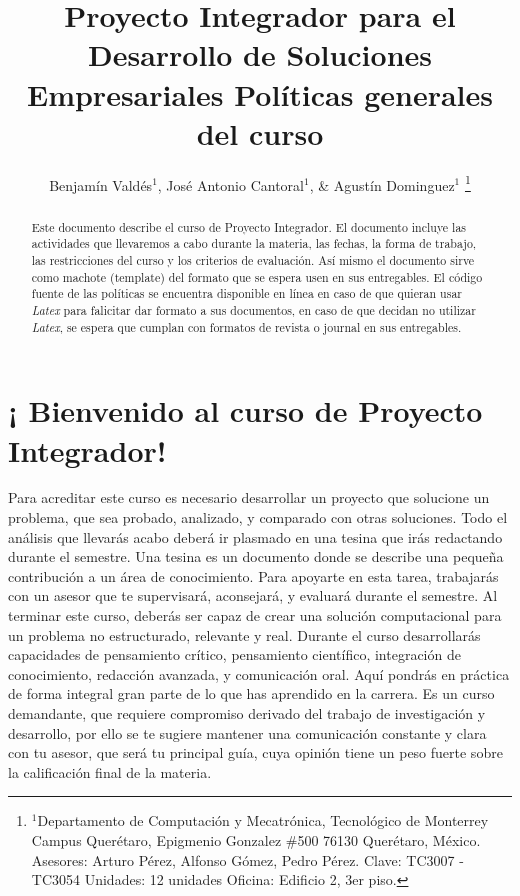 \documentclass[letterpaper, 10 pt, conference]{ieeeconf}  %
\title{\LARGE \bf
Proyecto Integrador para el Desarrollo de Soluciones Empresariales  Políticas generales del curso 
}
\author{Benjamín Valdés$^{1}$,  José Antonio Cantoral$^{1}$, \& Agustín Dominguez$^{1}$ %
\thanks{$^{1}$Departamento de  Computación y Mecatrónica,  Tecnológico de Monterrey Campus Querétaro, Epigmenio Gonzalez \#500 76130 Querétaro, México.
\newline Asesores: Arturo Pérez, Alfonso Gómez, Pedro Pérez.
\newline Clave: TC3007 - TC3054 
\newline Unidades: 12 unidades
\newline Oficina: Edificio 2, 3er piso.
\newline {\tt\small bvaldesa at itesm.mx}}%
}
\begin{document}
\maketitle
\thispagestyle{empty}
\pagestyle{empty}


\begin{abstract}

Este documento describe el curso de Proyecto Integrador. El documento incluye las actividades que llevaremos a cabo durante la materia, las fechas, la forma de trabajo, las restricciones del curso y los criterios de evaluación. Así mismo el documento sirve como machote (template) del formato que se espera usen en sus entregables. El código fuente de las políticas se encuentra disponible en línea en caso de que quieran usar \textit{Latex} para falicitar dar formato a sus documentos, en caso de que decidan no utilizar \textit{Latex}, se espera que cumplan con formatos de revista o journal en sus entregables.  
\end{abstract}


\section{¡ Bienvenido al curso de Proyecto Integrador!}

Para acreditar este curso es necesario desarrollar un proyecto que solucione un problema, que sea probado, analizado, y comparado con otras soluciones. Todo el análisis que llevarás acabo deberá ir plasmado en una tesina que irás redactando durante el semestre. Una tesina es un documento donde se describe una pequeña contribución a un área de conocimiento. Para apoyarte en esta tarea, trabajarás con un asesor que te supervisará, aconsejará, y evaluará durante el semestre. Al terminar este curso, deberás ser capaz de crear una solución computacional para un problema no estructurado, relevante y real. Durante el curso desarrollarás capacidades de pensamiento crítico, pensamiento científico, integración de conocimiento, redacción avanzada, y comunicación oral. Aquí pondrás en práctica de forma integral gran parte de lo que has aprendido en la carrera. Es un curso demandante, que requiere compromiso derivado del trabajo de investigación y desarrollo, por ello se te sugiere mantener una comunicación constante y clara con tu asesor, que será tu principal guía, cuya opinión tiene un peso fuerte sobre la calificación final de la materia.\\
\end{document}
